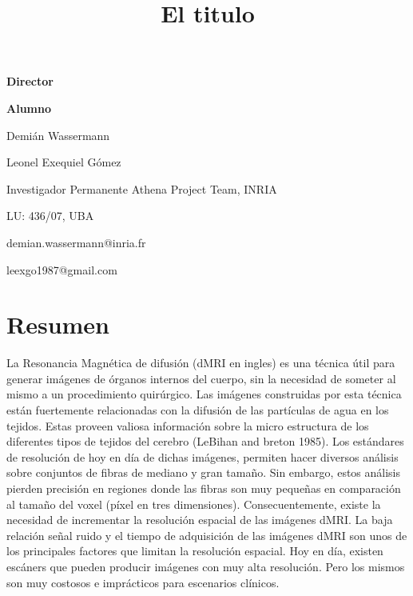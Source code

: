 \documentclass[a4paper,10pt]{article}
\title{El titulo}
\newcommand\textline[3][t]{%
  \par\smallskip\noindent\parbox[#1]{.658\textwidth}
  {\raggedright#2}%
  \parbox[#1]{.333\textwidth}{\raggedleft#3}%
}
\begin{document}
{
\textline[t]{\textbf{Director}}{\textbf{Alumno}}
\textline[t]{Demián Wassermann}{Leonel Exequiel G\'omez}
\textline[t]{Investigador Permanente Athena Project Team, INRIA}{LU: 436/07, UBA}
\textline[t]{demian.wassermann@inria.fr}{leexgo1987@gmail.com}
}


\section*{Resumen}

La Resonancia Magnética de difusión (dMRI en ingles) es una técnica útil para generar imágenes de 
órganos internos del 
cuerpo, sin la necesidad de someter al mismo a un procedimiento quirúrgico. Las imágenes construidas por esta técnica 
están fuertemente relacionadas con la difusión de las partículas de agua en los tejidos. Estas proveen valiosa 
información sobre la micro estructura de los diferentes tipos de tejidos del cerebro (LeBihan and 
breton 1985). %
Los estándares de resolución de hoy en día de dichas imágenes, permiten hacer 
diversos análisis sobre conjuntos de fibras de mediano y gran tamaño. Sin embargo, estos análisis 
pierden precisión en regiones donde las fibras son muy pequeñas en comparación 
al tamaño del voxel (píxel en tres dimensiones). Consecuentemente, existe la necesidad de 
incrementar la resolución espacial de las imágenes dMRI. La baja relaci\'on se\~nal ruido y el 
tiempo de adquisici\'on de las imágenes dMRI son unos de los principales factores que limitan la 
resolución espacial. %
Hoy en día, existen escáners que pueden 
producir imágenes con muy alta resolución. Pero los mismos son muy costosos e 
imprácticos para escenarios clínicos.
\end{document}
